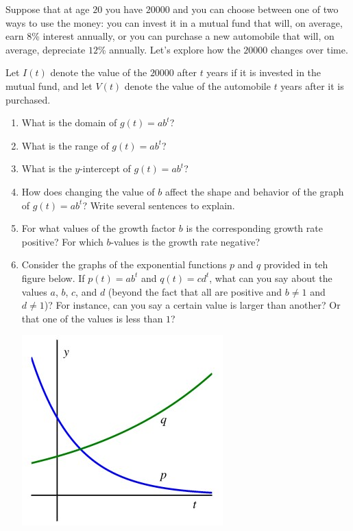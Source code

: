 \documentclass[nooutcomes]{ximera}
\begin{document}
\begin{exploration}
Suppose that at age \(20\) you have \textdollar{}\(20000\) and you can choose between one of two ways to use the money:  you can invest it in a mutual fund that will, on average, earn \(8\)\% interest annually, or you can purchase a new automobile that will, on average, depreciate \(12\)\% annually.  Let's explore how the \(20000\) changes over time.%

Let \(I(t)\) denote the value of the \textdollar{}\(20000\) after \(t\) years if it is invested in the mutual fund, and let \(V(t)\) denote the value of the automobile \(t\) years after it is purchased.

\begin{enumerate}[label=\alph*.]
\item What is the domain of \(g(t) = ab^t\)?
\item What is the range of \(g(t) = ab^t\)?
\item What is the \(y\)-intercept of \(g(t) = ab^t\)?
\item How does changing the value of \(b\) affect the shape and behavior of the graph of \(g(t) = ab^t\)?  Write several sentences to explain.
\item For what values of the growth factor \(b\) is the corresponding growth rate positive?  For which \(b\)-values is the growth rate negative?
\item Consider the graphs of the exponential functions \(p\) and \(q\) provided in teh figure below.  If \(p(t) = ab^t\) and \(q(t) = cd^t\), what can you say about the values \(a\), \(b\), \(c\), and \(d\) (beyond the fact that all are positive and \(b \ne 1\) and \(d \ne 1\))?  For instance, can you say a certain value is larger than another?  Or that one of the values is less than \(1\)?
\begin{image}
\includegraphics{ExpText2.jpg}
\end{image}
\end{enumerate}
\end{exploration}
%
\end{document}
